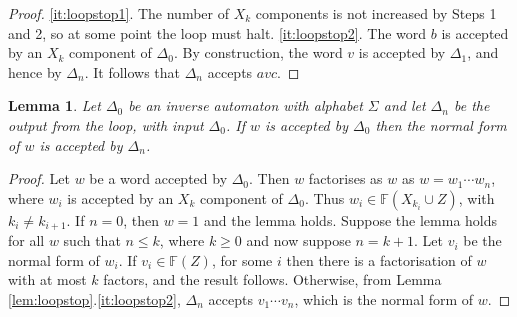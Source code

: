 \documentclass[a4paper,12pt]{article}
\renewcommand{\a}{\alpha }
\renewcommand{\b}{\beta }
\newcommand{\g}{\gamma }
\newcommand{\D}{\Delta }
\renewcommand{\d}{\delta }
\renewcommand{\L}{\Lambda }
\renewcommand{\S}{\Sigma }
\newtheorem{lemma}[theorem]{Lemma}
\numberwithin{equation}{section}
\numberwithin{figure}{section}
\newcommand{\FF}{\ensuremath{\mathbb{F}}}
\begin{document}
\begin{proof}
\ref{it:loopstop1}. The number of $X_k$ components is not
increased by Steps 1 and 2, so at some point the loop must halt.
\noindent \ref{it:loopstop2}. The word $b$ is accepted by an $X_k$
component of $\D_0$. By construction, the word $v$ is accepted by
$\D_1$, and hence by $\D_n$. It follows that $\D_n$ accepts $avc$.
\end{proof}
\begin{lemma}\label{lem:nfacc}
Let $\D_0$ be an inverse automaton with alphabet $\S$ and let
$\D_n$ be the output from the loop, with input $\D_0$. If $w$ is
accepted by $\D_0$ then the normal form of $w$ is accepted by $\D_n$.
\end{lemma}
\begin{proof}
Let $w$ be a word accepted by $\D_0$. Then $w$ factorises as  $w$
as $w=w_1\cdots w_n$, where $w_i$ is accepted by an $X_k$
component of $\D_0$. Thus $w_i\in \FF(X_{k_i}\cup Z)$, with $k_i\neq
k_{i+1}$. If $n=0$, then $w=1$ and the lemma holds. Suppose the
lemma holds for all $w$ such that $n\le k$, where $k\ge 0$ and now
suppose $n=k+1$. Let $v_i$ be the normal form of $w_i$. If $v_i\in
\FF(Z)$, for some $i$ then there is a factorisation of $w$ with at
most $k$ factors, and the result follows. Otherwise, from Lemma
\ref{lem:loopstop}.\ref{it:loopstop2},  $\D_n$ accepts $v_1\cdots
v_n$, which is the normal form of $w$.

\end{proof}
\end{document}
